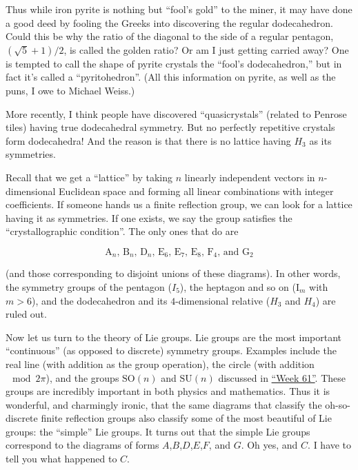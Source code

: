 \documentclass{article}
\begin{document}
Thus while iron pyrite is nothing but ``fool's gold'' to the miner, it
may have done a good deed by fooling the Greeks into discovering the
regular dodecahedron. Could this be why the ratio of the diagonal to the
side of a regular pentagon, \((\sqrt{5} + 1)/2\), is called the golden
ratio? Or am I just getting carried away? One is tempted to call the
shape of pyrite crystals the ``fool's dodecahedron,'' but in fact it's
called a ``pyritohedron''. (All this information on pyrite, as well as
the puns, I owe to Michael Weiss.)

More recently, I think people have discovered ``quasicrystals'' (related
to Penrose tiles) having true dodecahedral symmetry. But no perfectly
repetitive crystals form dodecahedra! And the reason is that there is no
lattice having \(H_3\) as its symmetries.

Recall that we get a ``lattice'' by taking \(n\) linearly independent
vectors in \(n\)-dimensional Euclidean space and forming all linear
combinations with integer coefficients. If someone hands us a finite
reflection group, we can look for a lattice having it as symmetries. If
one exists, we say the group satisfies the ``crystallographic
condition''. The only ones that do are

\[\mbox{$\mathrm{A}_n$, $\mathrm{B}_n$, $\mathrm{D}_n$, $\mathrm{E}_6$, $\mathrm{E}_7$, $\mathrm{E}_8$, $\mathrm{F}_4$, and $\mathrm{G}_2$}\]

(and those corresponding to disjoint unions of these diagrams). In other
words, the symmetry groups of the pentagon (\(I_5\)), the heptagon and
so on (\(\mathrm{I}_m\) with \(m > 6\)), and the dodecahedron and its
\(4\)-dimensional relative (\(H_3\) and \(H_4\)) are ruled out.

Now let us turn to the theory of Lie groups. Lie groups are the most
important ``continuous'' (as opposed to discrete) symmetry groups.
Examples include the real line (with addition as the group operation),
the circle (with addition \(\mod 2\pi\)), and the groups
\(\mathrm{SO}(n)\) and \(\mathrm{SU}(n)\) discussed in
\protect\hyperlink{week61}{``Week 61''}. These groups are incredibly
important in both physics and mathematics. Thus it is wonderful, and
charmingly ironic, that the same diagrams that classify the
oh-so-discrete finite reflection groups also classify some of the most
beautiful of Lie groups: the ``simple'' Lie groups. It turns out that
the simple Lie groups correspond to the diagrams of forms
\(A\),\(B\),\(D\),\(E\),\(F\), and \(G\). Oh yes, and \(C\). I have to
tell you what happened to \(C\).
\end{document}
